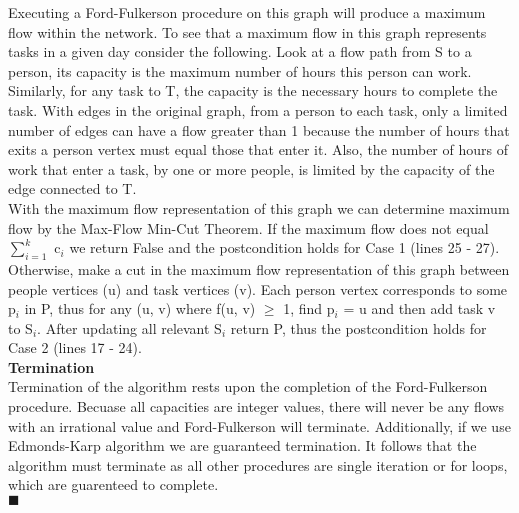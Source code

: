 \documentclass[10pt]{csc_assignment}
\begin{document}
\begin{description}
Executing a Ford-Fulkerson procedure on this graph will produce a maximum flow within the network. To see that a maximum flow in this graph represents tasks in a given day consider the following. Look at a flow path from S to a person, its capacity is the maximum number of hours this person can work. Similarly, for any task to T, the capacity is the necessary hours to complete the task. With edges in the original graph, from a person to each task, only a limited number of edges can have a flow greater than 1 because the number of hours that exits a person vertex must equal those that enter it. Also, the number of hours of work that enter a task, by one or more people, is limited by the capacity of the edge connected to T. \\
With the maximum flow representation of this graph we can determine maximum flow by the Max-Flow Min-Cut Theorem. If the maximum flow does not equal $\sum_{i = 1}^{k}$ c$_{i}$ we return False and the postcondition holds for Case 1 (lines 25 - 27). Otherwise, make a cut in the maximum flow representation of this graph between people vertices (u) and task vertices (v). Each person vertex corresponds to some p$_{i}$ in P, thus for any (u, v) where f(u, v) $\geqslant$ 1, find p$_{i}$ = u and then add task v to S$_{i}$. After updating all relevant S$_{i}$ return P, thus the postcondition holds for Case 2 (lines 17 - 24).\\
\textbf{Termination}\\
Termination of the algorithm rests upon the completion of the Ford-Fulkerson procedure. Becuase all capacities are integer values, there will never be any flows with an irrational value and Ford-Fulkerson will terminate. Additionally, if we use Edmonds-Karp algorithm we are guaranteed termination. It follows that the algorithm must terminate as all other procedures are single iteration or for loops, which are guarenteed to complete.\\
$\blacksquare$\\    



\end{description}
\end{document}
